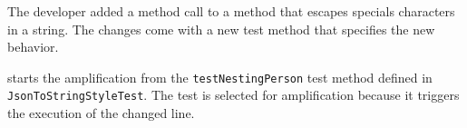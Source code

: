 The developer added a method call to a method that escapes specials characters in a string. 
The changes come with a new test method that specifies the new behavior.

\DCI starts the amplification from the \texttt{testNestingPerson} test method defined in \texttt{JsonToStringStyleTest}. 
The test is selected for amplification because it triggers the execution of the changed line.

\begin{figure}[h]
\centering
{}

\end{figure}
